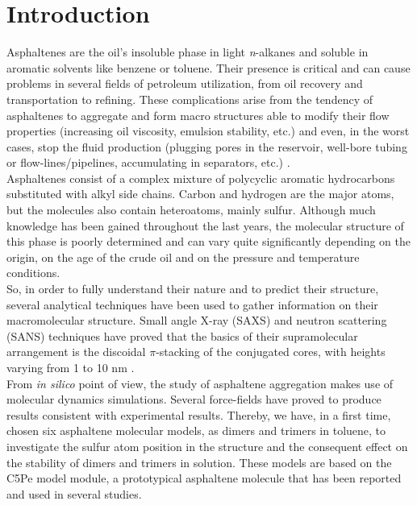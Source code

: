 \section{Introduction}


Asphaltenes are the oil's insoluble phase in light \textit{n}-alkanes and soluble in aromatic solvents like benzene or toluene\cite{mullins2011asphaltenes}. Their presence is critical and can cause problems in several fields of petroleum utilization, from oil recovery and transportation to refining.\cite{adams2014asphaltene} These complications arise from the tendency of asphaltenes to aggregate and form macro structures able to modify their flow properties (increasing oil viscosity, emulsion stability, etc.) and even, in the worst cases, stop the fluid production (plugging pores in the reservoir, well-bore tubing or flow-lines/pipelines, accumulating in separators, etc.) \cite{benamsili2013multi}.\\

Asphaltenes consist of a complex mixture of polycyclic aromatic hydrocarbons substituted with alkyl side chains. Carbon and hydrogen are the major atoms, but the molecules also contain heteroatoms, mainly sulfur.\cite{mullins2010modified} Although much knowledge has been gained throughout the last years, the molecular structure of this phase is poorly determined and can vary quite significantly depending on the origin, on the age of the crude oil and on the pressure and temperature conditions\cite{sabbah2011evidence}.\\

So, in order to fully understand their nature and to predict their structure, several analytical techniques have been used to gather information on their macromolecular structure. Small angle X-ray (SAXS) and neutron scattering (SANS) techniques have proved that the basics of their supramolecular arrangement is the discoidal $\pi$-stacking of the conjugated cores, with heights varying from 1 to 10 nm \cite{eyssautier2011insight,barre2009relation}.\\

From \textit{in silico} point of view, the study of asphaltene aggregation makes use of molecular dynamics simulations. Several force-fields have proved to produce results consistent with experimental results.\cite{sedghi2013effect,liu2015molecular,gao2014molecular} Thereby, we have, in a first time, chosen six asphaltene molecular models, as dimers and trimers in toluene, to investigate the sulfur atom position in the structure and the consequent effect on the stability of dimers and trimers in solution. These models are based on the C5Pe model module, a prototypical asphaltene molecule that has been reported and used in several studies\cite{gao2014molecular,teklebrhan2014initial}.\\

